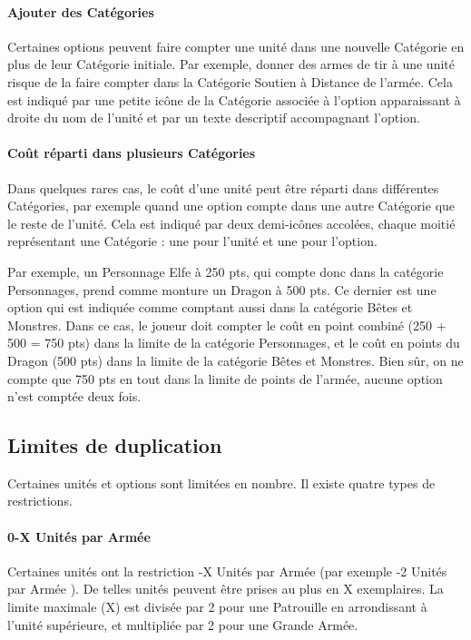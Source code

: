 \paragraph{Ajouter des Catégories}

Certaines options peuvent faire compter une unité dans une nouvelle Catégorie en plus de leur Catégorie initiale. Par exemple, donner des armes de tir à une unité risque de la faire compter dans la Catégorie \og Soutien à Distance \fg{} de l'armée. Cela est indiqué par une petite icône de la Catégorie associée à l'option apparaissant à droite du nom de l'unité et par un texte descriptif accompagnant l'option.

\paragraph{Coût réparti dans plusieurs Catégories}

Dans quelques rares cas, le coût d'une unité peut être réparti dans différentes Catégories, par exemple quand une option compte dans une autre Catégorie que le reste de l'unité. Cela est indiqué par deux demi-icônes accolées, chaque moitié représentant une Catégorie : une pour l'unité et une pour l'option.

Par exemple, un Personnage Elfe à 250 pts, qui compte donc dans la catégorie Personnages, prend comme monture un Dragon à 500 pts. Ce dernier est une option qui est indiquée comme comptant aussi dans la catégorie Bêtes et Monstres. Dans ce cas, le joueur doit compter le coût en point combiné (250 + 500 = 750 pts) dans la limite de la catégorie Personnages, et le coût en points du Dragon (500 pts) dans la limite de la catégorie Bêtes et Monstres. Bien sûr, on ne compte que 750 pts en tout dans la limite de points de l'armée, aucune option n'est comptée deux fois.

\subsection{Limites de duplication}

Certaines unités et options sont limitées en nombre. Il existe quatre types de restrictions.

\paragraph{0-X Unités par Armée}

Certaines unités ont la restriction -X Unités par Armée \fg{} (par exemple -2 Unités par Armée \fg{}). De telles unités peuvent être prises au plus en X exemplaires. La limite maximale (X) est divisée par 2 pour une Patrouille en arrondissant à l'unité supérieure, et multipliée par 2 pour une Grande Armée.

